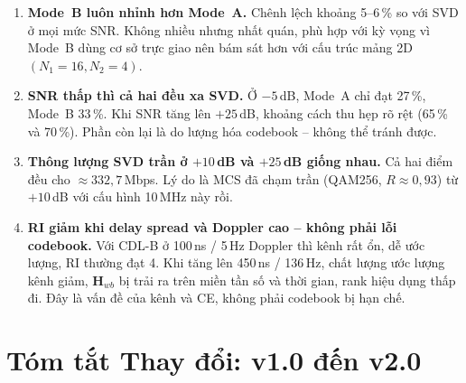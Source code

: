 \documentclass[11pt,a4paper]{article}
\begin{document}
\begin{enumerate}
    \item \textbf{Mode~B luôn nhỉnh hơn Mode~A.}
          Chênh lệch khoảng 5--6\,\% so với SVD ở mọi mức SNR. Không nhiều nhưng
          nhất quán, phù hợp với kỳ vọng vì Mode~B dùng cơ sở trực giao nên bám
          sát hơn với cấu trúc mảng 2D $(N_1=16, N_2=4)$.

    \item \textbf{SNR thấp thì cả hai đều xa SVD.}
          Ở $-5$\,dB, Mode~A chỉ đạt 27\,\%, Mode~B 33\,\%. Khi SNR tăng lên
          $+25$\,dB, khoảng cách thu hẹp rõ rệt (65\,\% và 70\,\%). Phần còn lại
          là do lượng hóa codebook -- không thể tránh được.

    \item \textbf{Thông lượng SVD trần ở $+10$\,dB và $+25$\,dB giống nhau.}
          Cả hai điểm đều cho $\approx 332{,}7$\,Mbps. Lý do là MCS đã chạm trần
          (QAM256, $R \approx 0{,}93$) từ $+10$\,dB với cấu hình 10\,MHz này rồi.

    \item \textbf{RI giảm khi delay spread và Doppler cao -- không phải lỗi codebook.}
          Với CDL-B ở 100\,ns / 5\,Hz Doppler thì kênh rất ổn, dễ ước lượng, RI
          thường đạt 4. Khi tăng lên 450\,ns / 136\,Hz, chất lượng ước lượng kênh
          giảm, $\mathbf{H}_{wb}$ bị trải ra trên miền tần số và thời gian, rank
          hiệu dụng thấp đi. Đây là vấn đề của kênh và CE, không phải codebook bị
          hạn chế.
\end{enumerate}

\FloatBarrier
\section{Tóm tắt Thay đổi: v1.0 đến v2.0}
\end{document}
